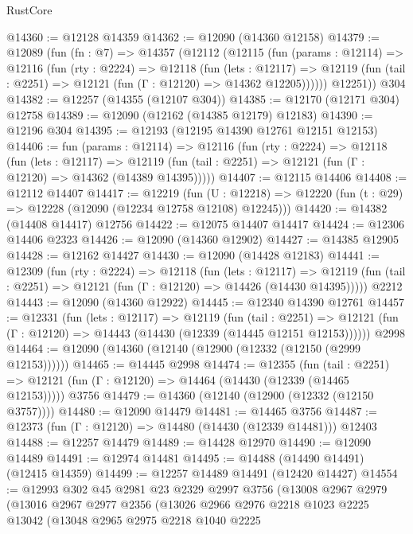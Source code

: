 \begin{lexlean}{RustCore}
\begin{coremodule}
@14360 := @12128 @14359
@14362 := @12090 (@14360 @12158)
@14379 := @12089
    (fun (fn : @7) =>
    @14357
      (@12112
        (@12115
          (fun (params : @12114) =>
          @12116
            (fun (rty : @2224) =>
            @12118
              (fun (lets : @12117) =>
              @12119 (fun (tail : @2251) => @12121 (fun (Γ : @12120) => @14362 @12205))))))
        @12251))
    @304
@14382 := @12257 (@14355 (@12107 @304))
@14385 := @12170 (@12171 @304) @12758
@14389 := @12090 (@12162 (@14385 @12179) @12183)
@14390 := @12196 @304
@14395 := @12193 (@12195 @14390 @12761 @12151 @12153)
@14406 := fun (params : @12114) =>
  @12116
    (fun (rty : @2224) =>
    @12118
      (fun (lets : @12117) =>
      @12119 (fun (tail : @2251) => @12121 (fun (Γ : @12120) => @14362 (@14389 @14395)))))
@14407 := @12115 @14406
@14408 := @12112 @14407
@14417 := @12219
    (fun (U : @12218) => @12220 (fun (t : @29) => @12228 (@12090 (@12234 @12758 @12108) @12245)))
@14420 := @14382 (@14408 @14417) @12756
@14422 := @12075 @14407 @14417
@14424 := @12306 @14406 @2323
@14426 := @12090 (@14360 @12902)
@14427 := @14385 @12905
@14428 := @12162 @14427
@14430 := @12090 (@14428 @12183)
@14441 := @12309
    (fun (rty : @2224) =>
    @12118
      (fun (lets : @12117) =>
      @12119 (fun (tail : @2251) => @12121 (fun (Γ : @12120) => @14426 (@14430 @14395)))))
    @2212
@14443 := @12090 (@14360 @12922)
@14445 := @12340 @14390 @12761
@14457 := @12331
    (fun (lets : @12117) =>
    @12119
      (fun (tail : @2251) =>
      @12121 (fun (Γ : @12120) => @14443 (@14430 (@12339 (@14445 @12151 @12153))))))
    @2998
@14464 := @12090 (@14360 (@12140 (@12900 (@12332 (@12150 (@2999 @12153))))))
@14465 := @14445 @2998
@14474 := @12355
    (fun (tail : @2251) => @12121 (fun (Γ : @12120) => @14464 (@14430 (@12339 (@14465 @12153)))))
    @3756
@14479 := @14360 (@12140 (@12900 (@12332 (@12150 @3757))))
@14480 := @12090 @14479
@14481 := @14465 @3756
@14487 := @12373 (fun (Γ : @12120) => @14480 (@14430 (@12339 @14481))) @12403
@14488 := @12257 @14479
@14489 := @14428 @12970
@14490 := @12090 @14489
@14491 := @12974 @14481
@14495 := @14488 (@14490 @14491) (@12415 @14359)
@14499 := @12257 @14489 @14491 (@12420 @14427)
@14554 := @12993
    @302
    @45
    @2981
    @23
    @2329
    @2997
    @3756
    (@13008
      @2967
      @2979
      (@13016
        @2967
        @2977
        @2356
        (@13026
          @2966
          @2976
          @2218
          @1023
          @2225
          @13042
          (@13048
            @2965
            @2975
            @2218
            @1040
            @2225

\end{coremodule}
\end{lexlean}
